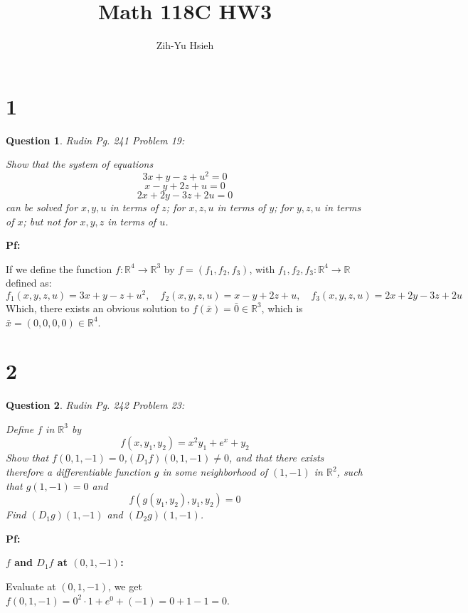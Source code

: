 \documentclass{article}
\title{Math 118C HW3}
\author{Zih-Yu Hsieh}
\newtheorem{question}{Question}
\begin{document}
\maketitle

\section*{1}
\begin{myBox}[]{}
    \begin{question}
        Rudin Pg. 241 Problem 19:

        Show that the system of equations
        $$3x+y-z+u^2=0$$
        $$x-y+2z+u=0$$
        $$2x+2y-3z+2u=0$$
        can be solved for $x,y,u$ in terms of $z$; for $x,z,u$ in terms of $y$; for $y,z,u$ in terms of $x$; but not for $x,y,z$ in terms of $u$.
    \end{question}
\end{myBox}

\textbf{Pf:}

If we define the function $f:\mathbb{R}^4\rightarrow\mathbb{R}^3$ by $f=(f_1,f_2,f_3)$, with $f_1,f_2,f_3:\mathbb{R}^4\rightarrow\mathbb{R}$ defined as:
$$f_1(x,y,z,u)=3x+y-z+u^2,\quad f_2(x,y,z,u)=x-y+2z+u,\quad f_3(x,y,z,u)=2x+2y-3z+2u$$
Which, there exists an obvious solution to $f(\bar{x})=\bar{0}\in\mathbb{R}^3$, which is $\bar{x}=(0,0,0,0)\in\mathbb{R}^4$.

\textbf{}

\break

\section*{2}
\begin{myBox}[]{}
    \begin{question}
        Rudin Pg. 242 Problem 23:

        Define $f$ in $\mathbb{R}^3$ by
        $$f(x,y_1,y_2)=x^2y_1+e^x+y_2$$
        Show that $f(0,1,-1)=0$,$(D_1f)(0,1,-1)\neq 0$, and that there exists therefore a differentiable function $g$ in some neighborhood of $(1,-1)$ in $\mathbb{R}^2$,
        such that $g(1,-1)=0$ and 
        $$f(g(y_1,y_2),y_1,y_2)=0$$
        Find $(D_1g)(1,-1)$ and $(D_2g)(1,-1)$.
    \end{question}
\end{myBox}

\textbf{Pf:}

\textbf{$f$ and $D_1f$ at $(0,1,-1)$:}

Evaluate at $(0,1,-1)$, we get $f(0,1,-1) = 0^2\cdot 1 + e^0 + (-1) = 0+1-1 = 0$.
\end{document}
